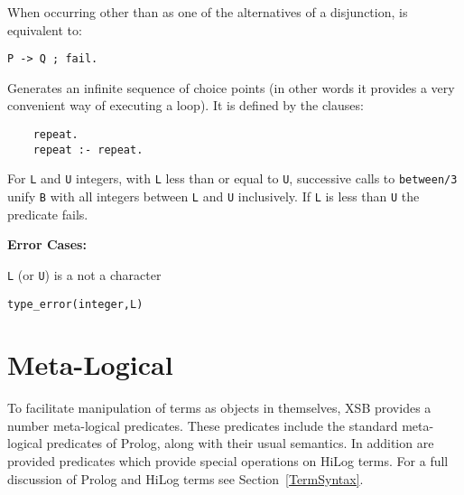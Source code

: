 \begin{description}
 
    When occurring other than as one of the alternatives of a disjunction,
    is equivalent to:
	\begin{center}
	{\tt P -> Q ; fail.}
	\end{center}

    Generates an infinite sequence of choice points (in other words it 
    provides a very convenient way of executing a loop). It is defined 
    by the clauses:
    \begin{center}
    \begin{minipage}{1.5in}
    \begin{verbatim}
	repeat.
	repeat :- repeat.
    \end{verbatim}
    \end{minipage}
    \end{center}

%
For {\tt L} and {\tt U} integers, with {\tt L} less than or equal to
{\tt U}, successive calls to {\tt between/3} unify {\tt B} with all
integers between {\tt L} and {\tt U} inclusively.  If {\tt L} is less
than {\tt U} the predicate fails.

{\bf Error Cases:}
\bi
\item 	{\tt L} (or {\tt U}) is a not a character
\bi
\item 	{\tt type\_error(integer,L)}
\ei
\ei
\end{description}



\section{Meta-Logical}\label{MetaLogical}

To facilitate manipulation of terms as objects in themselves,
XSB provides a number meta-logical predicates.  These
predicates include the standard meta-logical predicates of Prolog,
along with their usual semantics.  In addition are provided predicates
which provide special operations on HiLog terms.  For a full
discussion of Prolog and HiLog terms see Section~\ref{TermSyntax}.

